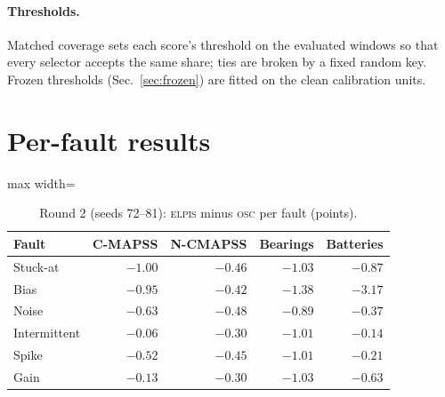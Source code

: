 \documentclass{esannV2}
\newcommand{\OSC}{\textsc{osc}}
\newcommand{\RPT}{\textsc{elpis}}
\begin{document}
\paragraph{Thresholds.} Matched coverage sets each score's threshold on the evaluated windows so that every selector accepts the same share; ties are broken by a fixed random key. Frozen thresholds (Sec.~\ref{sec:frozen}) are fitted on the clean calibration units.

\FloatBarrier
\section{Per-fault results}

\begin{table}[!htbp]
\caption{Round 2 (seeds 72--81): \RPT{} minus \OSC{} per fault (points).}
\label{tab:fault}
\centering\footnotesize
\begin{adjustbox}{max width=\textwidth}\begin{tabular}{lrrrr}
\toprule
Fault & C-MAPSS & N-CMAPSS & Bearings & Batteries\\
\midrule
Stuck-at & $-1.00$ & $-0.46$ & $-1.03$ & $-0.87$\\
Bias & $-0.95$ & $-0.42$ & $-1.38$ & $-3.17$\\
Noise & $-0.63$ & $-0.48$ & $-0.89$ & $-0.37$\\
Intermittent & $-0.06$ & $-0.30$ & $-1.01$ & $-0.14$\\
Spike & $-0.52$ & $-0.45$ & $-1.01$ & $-0.21$\\
Gain & $-0.13$ & $-0.30$ & $-1.03$ & $-0.63$\\
\bottomrule
\end{tabular}\end{adjustbox}
\end{table}

\FloatBarrier
\end{document}
